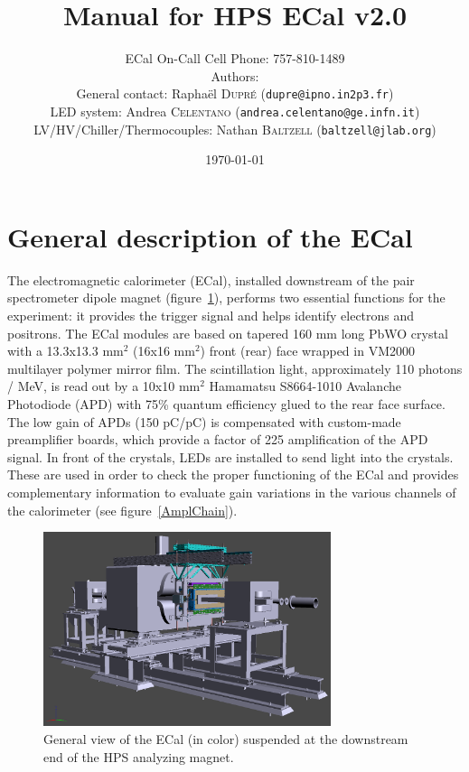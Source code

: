 \documentclass[12pt]{article}
\title{Manual for HPS ECal v2.0}
\author{ECal On-Call Cell Phone: 757-810-1489 \\ 
Authors: \\
General contact: Rapha\"el \textsc{Dupr\'e} (\texttt{dupre@ipno.in2p3.fr})\\ 
LED system: Andrea \textsc{Celentano} (\texttt{andrea.celentano@ge.infn.it})\\
LV/HV/Chiller/Thermocouples: Nathan \textsc{Baltzell} (\texttt{baltzell@jlab.org})\\
}
\date{\today} %
\begin{document}
\maketitle{}

\tableofcontents

\newpage
   \section{General description of the ECal}


The electromagnetic calorimeter (ECal), installed downstream of the pair spectrometer dipole magnet (figure~\ref{GView}), performs two essential functions for the experiment: it provides the trigger signal and helps identify electrons and positrons. The ECal modules are based on tapered 160 mm long PbWO crystal with a 13.3x13.3 mm$^2$ (16x16 mm$^2$) front (rear) face wrapped in VM2000 multilayer polymer mirror film. The scintillation light, approximately 110 photons / MeV, is read out by a 10x10 mm$^2$ Hamamatsu S8664-1010 Avalanche Photodiode (APD) with 75\% quantum efficiency glued to the rear face surface. The low gain of APDs (150 pC/pC) is compensated with custom-made preamplifier boards, which provide a factor of 225 amplification of the APD signal. In front of the crystals, LEDs are installed to send light into the crystals. These are used in order to check the proper functioning of the ECal and provides complementary information to evaluate gain variations in the various channels of the calorimeter (see figure~\ref{AmplChain}).

\begin{figure}[htpb]\center
\includegraphics[width=0.75\textwidth]{pics/GView.png}
\caption{\label{GView} General view of the ECal (in color) suspended at the downstream end of the HPS analyzing magnet.}
\end{figure}
      
\end{document}
